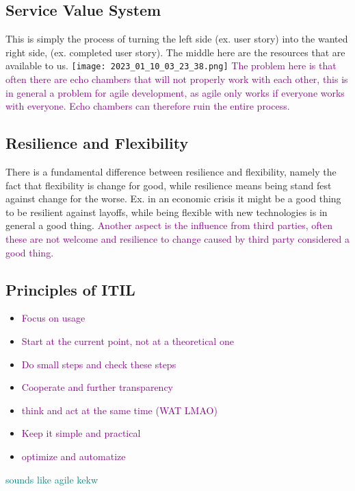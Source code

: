 \documentclass[main.tex,fontsize=12pt,paper=a4,paper=landscape,DIV=calc,]{scrartcl}
\begin{document}
\begin{multicols*}{2}
\subsection{Service Value System}
This is simply the process of turning the left side (ex. user story) into the wanted right side, (ex. completed user story).\newline
The middle here are the resources that are available to us.\newline
\texttt{[image: 2023\_01\_10\_03\_23\_38.png]}\newline
\textcolor{purple}{The problem here is that often there are echo chambers that will not properly work with each other, this is in general a problem for agile development, as agile only works if everyone works with everyone. Echo chambers can therefore ruin the entire process.}

\subsection{Resilience and Flexibility}
There is a fundamental difference between resilience and flexibility, namely the fact that flexibility is change for good, while resilience means being stand fest against change for the worse.\newline
Ex. in an economic crisis it might be a good thing to be resilient against layoffs, while being flexible with new technologies is in general a good thing. \newline
\textcolor{purple}{Another aspect is the influence from third parties, often these are not welcome and resilience to change caused by third party considered a good thing.}

\subsection{Principles of ITIL}
\begin{itemize}
\item \textcolor{purple}{Focus on usage}
\item \textcolor{purple}{Start at the current point, not at a theoretical one}
\item \textcolor{purple}{Do small steps and check these steps}
\item \textcolor{purple}{Cooperate and further transparency}
\item \textcolor{purple}{think and act at the same time (WAT LMAO)}
\item \textcolor{purple}{Keep it simple and practical}
\item \textcolor{purple}{optimize and automatize}
\end{itemize}
\textcolor{teal}{sounds like agile kekw}


\end{multicols*}
\end{document}
